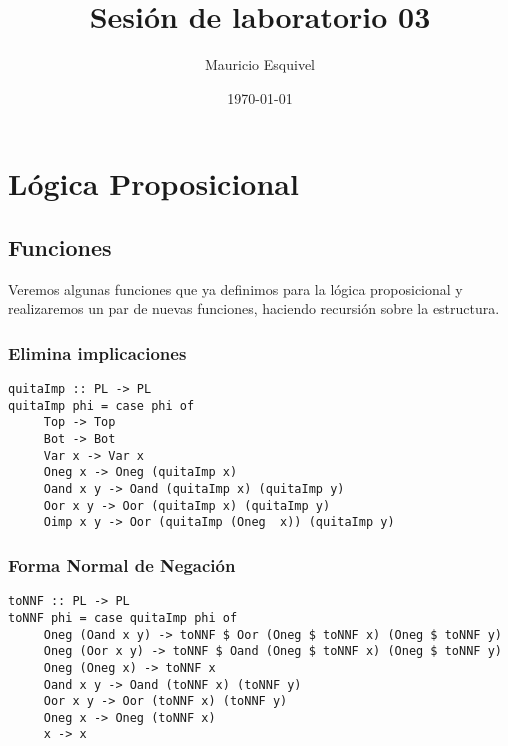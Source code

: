 \documentclass[11pt]{article}
\author{Mauricio Esquivel}
\date{\today}
\title{Sesión de laboratorio 03}
\begin{document}
\maketitle
\tableofcontents

\section{Lógica Proposicional}
\label{sec:org0b64e7f}
\subsection{Funciones}
\label{sec:orgaf07e5e}
Veremos algunas funciones que ya definimos para la lógica proposicional y 
realizaremos un par de nuevas funciones, haciendo recursión sobre la estructura.
\subsubsection{Elimina implicaciones}
\label{sec:orgfc7fb97}
\begin{verbatim}
quitaImp :: PL -> PL
quitaImp phi = case phi of
     Top -> Top
     Bot -> Bot
     Var x -> Var x
     Oneg x -> Oneg (quitaImp x)
     Oand x y -> Oand (quitaImp x) (quitaImp y)
     Oor x y -> Oor (quitaImp x) (quitaImp y)
     Oimp x y -> Oor (quitaImp (Oneg  x)) (quitaImp y)
\end{verbatim}
\subsubsection{Forma Normal de Negación}
\label{sec:orgdb48c3a}
\begin{verbatim}
toNNF :: PL -> PL
toNNF phi = case quitaImp phi of
     Oneg (Oand x y) -> toNNF $ Oor (Oneg $ toNNF x) (Oneg $ toNNF y)
     Oneg (Oor x y) -> toNNF $ Oand (Oneg $ toNNF x) (Oneg $ toNNF y)
     Oneg (Oneg x) -> toNNF x
     Oand x y -> Oand (toNNF x) (toNNF y)
     Oor x y -> Oor (toNNF x) (toNNF y)
     Oneg x -> Oneg (toNNF x)
     x -> x
\end{verbatim}
\end{document}
